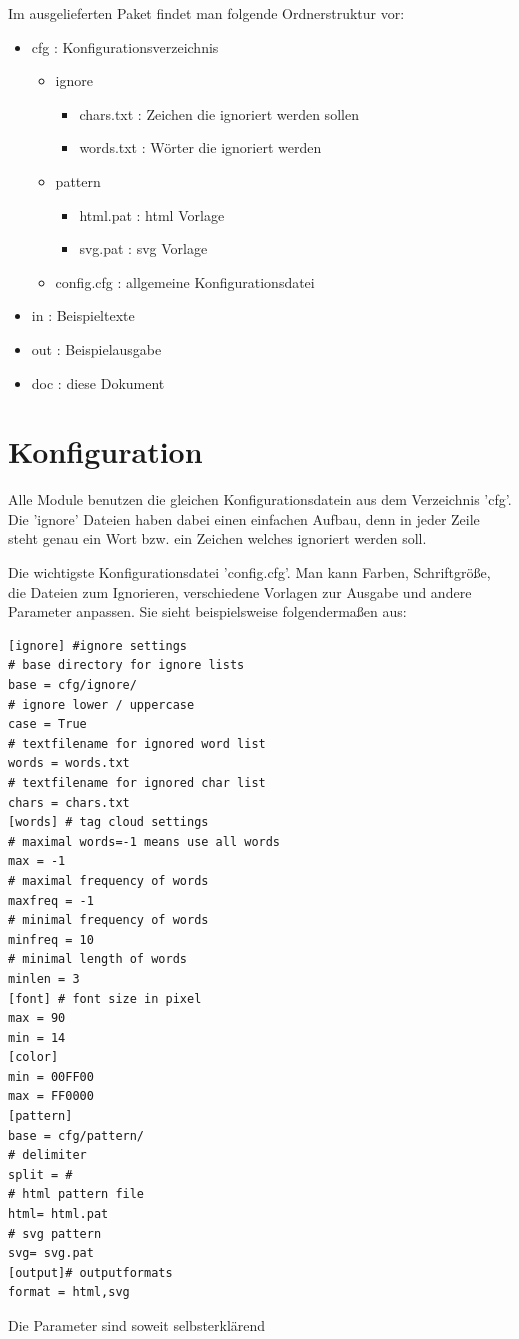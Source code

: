 Im ausgelieferten Paket findet man folgende Ordnerstruktur vor:
\begin{itemize}
    \item cfg : Konfigurationsverzeichnis
        \begin{itemize}
            \item ignore 
                \begin{itemize}
                    \item chars.txt : Zeichen die ignoriert werden sollen 
                    \item words.txt : Wörter die ignoriert werden
                \end{itemize}
            \item pattern
                \begin{itemize}
                    \item html.pat : html Vorlage
                    \item svg.pat : svg Vorlage
                \end{itemize}
            \item config.cfg : allgemeine Konfigurationsdatei
        \end{itemize}
    \item in : Beispieltexte  
    \item out : Beispielausgabe
    \item doc : diese Dokument
\end{itemize}

\section{Konfiguration}
Alle Module benutzen die gleichen Konfigurationsdatein aus dem Verzeichnis 'cfg'.
Die 'ignore' Dateien haben dabei einen einfachen Aufbau, denn in jeder Zeile steht genau ein Wort bzw. ein Zeichen 
welches ignoriert werden soll.

Die wichtigste Konfigurationsdatei 'config.cfg'. Man kann Farben, Schriftgröße, die Dateien zum Ignorieren, verschiedene Vorlagen zur Ausgabe 
und andere Parameter anpassen.
Sie sieht beispielsweise folgendermaßen aus:
\begin{lstlisting}
[ignore] #ignore settings
# base directory for ignore lists
base = cfg/ignore/
# ignore lower / uppercase
case = True
# textfilename for ignored word list
words = words.txt
# textfilename for ignored char list
chars = chars.txt
[words] # tag cloud settings
# maximal words=-1 means use all words
max = -1
# maximal frequency of words
maxfreq = -1
# minimal frequency of words
minfreq = 10
# minimal length of words
minlen = 3
[font] # font size in pixel
max = 90
min = 14
[color]
min = 00FF00
max = FF0000
[pattern]
base = cfg/pattern/
# delimiter
split = #
# html pattern file
html= html.pat
# svg pattern
svg= svg.pat
[output]# outputformats 
format = html,svg
\end{lstlisting}
Die Parameter sind soweit selbsterklärend
